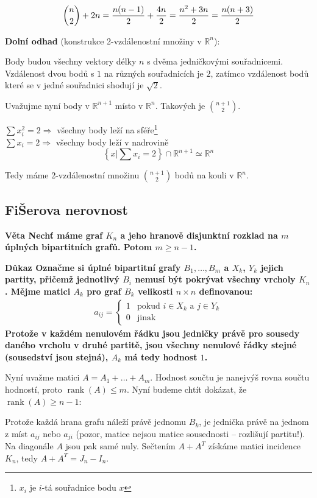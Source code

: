 \documentclass[a4paper,12pt,titlepage]{article}
\newcommand{\dk}{\smallskip\noindent\bf Důkaz\rm{} }
\newcommand{\vt}{\smallskip\noindent\bf Věta\rm{} }
\newcommand{\R}{\mathbb{R}}
\DeclareMathOperator{\rank}{rank}
\begin{document}
$${n\choose 2} + 2n = {n(n-1)\over 2} + {4n\over 2} = {n^2+3n\over 2} = {n(n+3) \over 2}$$

{\bf Dolní odhad} (konstrukce 2-vzdálenostní množiny v $\R^n$):

Body budou všechny vektory délky $n$ s dvěma jedničkovými souřadnicemi. Vzdálenost dvou bodů s $1$ na různých souřadnicích je $2$, zatímco vzdálenost bodů které se v jedné souřadnici shodují je $\sqrt 2$.

Uvažujme nyní body v $\R^{n+1}$ místo v $\R^n$. Takových je $n+1 \choose 2$. 

\bigskip
$\sum x_i^2 = 2 \Rightarrow$ všechny body leží na sféře\footnote{$x_i$ je $i$-tá souřadnice bodu $x$}\\
\indent$\sum x_i = 2 \Rightarrow$ všechny body leží v nadrovině \\

$$\left\{x | \sum x_i = 2 \right\} \cap \R^{n+1} \simeq \R^n$$

Tedy máme 2-vzdálenostní množinu $n+1 \choose 2$ bodů na kouli v $\R^n$.


\subsection{FiŠerova nerovnost}

\vt Nechť máme graf $K_n$ a jeho hranově disjunktní rozklad na $m$ úplných 
bipartitních grafů. Potom $m \geq n-1$.

\dk Označme si úplné bipartitní grafy $B_1, \ldots, B_m$ a $X_k$, $Y_k$ jejich 
partity, přičemž jednotlivý $B_i$ nemusí být pokrývat všechny vrcholy $K_n$.  
Mějme matici $A_k$ pro graf $B_k$ velikosti $n \times n$ definovanou:
\begin{align}
	a_{ij} = \left\{\begin{array}{ll}1 & \text{pokud } i \in X_k\text{ a }j \in 
	Y_k \\ 0 & \text{jinak} \end{array}\right.
\end{align}
Protože v každém nenulovém řádku jsou jedničky právě pro sousedy daného vrcholu 
v druhé partitě, jsou všechny nenulové řádky stejné (sousedství jsou stejná), 
$A_k$ má tedy hodnost $1$.

Nyní uvažme matici $A=A_1 + \ldots + A_m$. Hodnost součtu je nanejvýš rovna 
součtu hodností, proto $\rank(A) \leq m$. Nyní budeme chtít dokázat, že 
$\rank(A) \geq n-1$:

Protože každá hrana grafu náleží právě jednomu $B_k$, je jednička právě na 
jednom z míst $a_{ij}$ nebo $a_{ji}$ (pozor, matice nejsou matice sousednosti -- 
rozlišují partitu!). Na diagonále $A$ jsou pak samé nuly. Sečtením $A+A^T$ 
získáme matici incidence $K_n$, tedy $A+A^T=J_n - I_n$.
\end{document}
